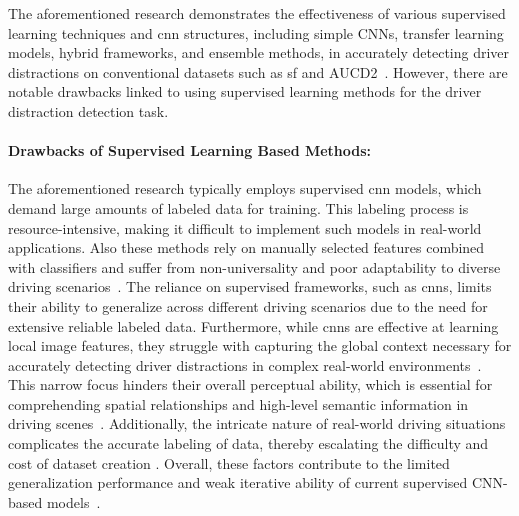 The aforementioned research demonstrates the effectiveness of various supervised learning techniques and \gls{cnn} structures, including simple CNNs, transfer learning models, hybrid frameworks, and ensemble methods, in accurately detecting driver distractions on conventional datasets such as \gls{sf} and AUCD2~\citep{AUC_D3_dataset_abouelnaga2017real}. However, there are notable drawbacks linked to using supervised learning methods for the driver distraction detection task. 

\paragraph{Drawbacks of Supervised Learning Based Methods:}
The aforementioned research typically employs supervised \gls{cnn} models, which demand large amounts of labeled data for training. This labeling process is resource-intensive, making it difficult to implement such models in real-world applications. Also these methods rely on manually selected features combined with classifiers and suffer from non-universality and poor adaptability to diverse driving scenarios~\citep{bing_li_2022new, masked_image_modeling_dd_zhang2023novel}. The reliance on supervised frameworks, such as \gls{cnn}s, limits their ability to generalize across different driving scenarios due to the need for extensive reliable labeled data. Furthermore, while \gls{cnn}s are effective at learning local image features, they struggle with capturing the global context necessary for accurately detecting driver distractions in complex real-world environments~\citep{bing_li_2022new, masked_image_modeling_dd_zhang2023novel}. This narrow focus hinders their overall perceptual ability, which is essential for comprehending spatial relationships and high-level semantic information in driving scenes~\citep{masked_image_modeling_dd_zhang2023novel}. Additionally, the intricate nature of real-world driving situations complicates the accurate labeling of data, thereby escalating the difficulty and cost of dataset creation . Overall, these factors contribute to the limited generalization performance and weak iterative ability of current supervised CNN-based models~\citep{masked_image_modeling_dd_zhang2023novel}.


